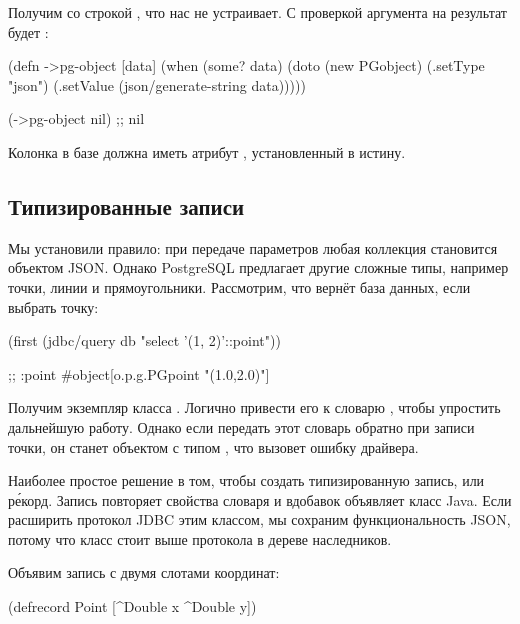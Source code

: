 Получим  со строкой , что нас не устраивает. С проверкой аргумента на  результат будет :

\begin{english}
  \begin{clojure}
(defn ->pg-object [data]
  (when (some? data)
    (doto (new PGobject)
      (.setType "json")
      (.setValue (json/generate-string data)))))

(->pg-object nil) ;; nil
  \end{clojure}
\end{english}

Колонка в базе должна иметь атрибут , установленный в истину.

\subsection{Типизированные записи}

Мы установили правило: при передаче параметров любая коллекция становится объектом JSON. Однако PostgreSQL предлагает другие сложные типы, например точки, линии и прямоугольники. Рассмотрим, что вернёт база данных, если выбрать точку:

\begin{english}
  \begin{clojure}
(first
  (jdbc/query db "select '(1, 2)'::point"))

;; {:point #object[o.p.g.PGpoint "(1.0,2.0)"]}
  \end{clojure}
\end{english}

Получим экземпляр класса . Логично привести его к словарю , чтобы упростить дальнейшую работу. Однако если передать этот словарь обратно при записи точки, он станет объектом  с типом , что вызовет ошибку драйвера.


Наиболее простое решение в том, чтобы создать типизированную запись, или р\'{е}корд. Запись повторяет свойства словаря и вдобавок объявляет класс Java. Если расширить протокол JDBC этим классом, мы сохраним функциональность JSON, потому что класс стоит выше протокола  в дереве наследников.

Объявим запись с двумя слотами координат:

\begin{english}
  \begin{clojure}
(defrecord Point
  [^Double x ^Double y])
  \end{clojure}
\end{english}

